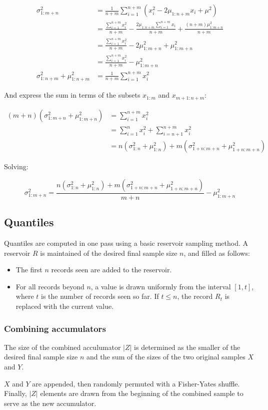 \documentclass[a4paper]{article}
\begin{document}
\[\begin{aligned}\sigma_{1:m+n}^2 &= \frac{1}{n+m} \sum\limits_{i=1}^{n+m} (x_i^2 - 2\mu_{1:n+m}x_i + \mu^2) \\
  &= \frac{\sum\limits_{i=1}^{n+m} x_i^2}{n+m} - \frac{2\mu_{1:n+m}\sum\limits_{i=1}^{n+m} x_i}{n+m} + \frac{(n + m)\mu_{1:m+n}^2}{n+m} \\
  &= \frac{\sum\limits_{i=1}^{n+m} x_i^2}{n+m} - 2\mu_{1:m+n}^2 + \mu_{1:m+n}^2 \\
  &= \frac{\sum\limits_{i=1}^{n+m} x_i^2}{n+m} - \mu_{1:m+n}^2 \\
  \sigma_{1:n+m}^2 + \mu_{1:n+m}^2 &= \frac{1}{n+m} \sum\limits_{i=1}^{n+m} x_i^2\end{aligned}\]

And express the sum in terms of the subsets \(x_{1:m}\) and
\(x_{m+1:n+m}\):

\[\begin{aligned}(m + n)(\sigma_{1:m+n}^2 + \mu_{1:m+n}^2) &= \sum\limits_{i=1}^{n+m} x_i^2 \\
  &= \sum_{i=1}^n x_i^2 + \sum_{i=n+1}^{n+m} x_i^2 \\
  &= n(\sigma^2_{1:n} + \mu_{1:n}^2) + m(\sigma_{1+n:m+n}^2 + \mu_{1+n:m+n}^2)\end{aligned}\]

Solving:

\[\sigma_{1:m+n}^2 = \frac{n(\sigma_{1:n}^2 + \mu_{1:n}^2) + m(\sigma_{1+n:m+n}^2 + \mu_{1+n:m+n}^2)}{m+n} - \mu_{1:m+n}^2\]

\subsection{Quantiles}\label{quantiles}

Quantiles are computed in one pass using a basic reservoir
sampling\cite{vitter1985}\cite[pp.~144-145]{Knuth1997} method. A reservoir \(R\) is maintained of
the desired final sample size \(n\), and filled as follows:

\begin{itemize}
\item
The first \(n\) records seen are added to the reservoir.

\item
For all records beyond \(n\), a value is drawn uniformly from the
interval \([1, t]\), where \(t\) is the number of records seen so
far. If \(t \leq n\), the record \(R_t\) is replaced with the current value.
\end{itemize}

\subsubsection{Combining accumulators}

The size of the combined acculumator \(|Z|\) is determined as
the smaller of the desired final sample size \(n\) and the sum of the
sizes of the two original samples \(X\) and \(Y\).

\(X\) and \(Y\) are appended, then randomly permuted with a
Fisher-Yates shuffle\cite[pp.~145-146]{Knuth1997}. Finally, \(|Z|\) elements are drawn from the
beginning of the combined sample to serve as the new accumulator.



\end{document}
